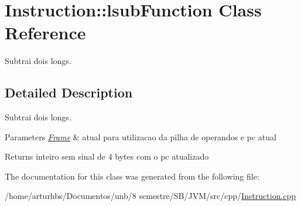 \hypertarget{classInstruction_1_1lsubFunction}{}\section{Instruction\+:\+:lsub\+Function Class Reference}
\label{classInstruction_1_1lsubFunction}


Subtrai dois longs.  




\subsection{Detailed Description}
Subtrai dois longs. 


\begin{DoxyParams}{Parameters}
{\em \hyperlink{classFrame}{Frame}} & atual para utilizacao da pilha de operandos e pc atual \\
\hline
\end{DoxyParams}
\begin{DoxyReturn}{Returns}
inteiro sem sinal de 4 bytes com o pc atualizado 
\end{DoxyReturn}


The documentation for this class was generated from the following file\+:\begin{DoxyCompactItemize}
\item 
/home/arturhbs/\+Documentos/unb/8 semestre/\+S\+B/\+J\+V\+M/src/cpp/\hyperlink{Instruction_8cpp}{Instruction.\+cpp}\end{DoxyCompactItemize}
